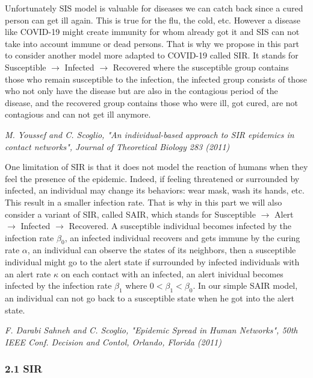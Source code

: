\documentclass{article}
\begin{document}
Unfortunately SIS model is valuable for diseases we can catch back since a cured person can get ill again. This is true for the flu, the cold, etc. However a disease like COVID-19 might create immunity for whom already got it and SIS can not take into account immune or dead persons. That is why we propose in this part to consider another model more adapted to COVID-19 called SIR. It stands for Susceptible $\rightarrow$ Infected $\rightarrow$ Recovered where the susceptible group contains those who remain susceptible to the infection, the infected group consists of those who not only have the disease but are also in the contagious period of the disease, and the recovered group contains those who were ill, got cured, are not contagious and can not get ill anymore.

\medskip

\textit{M. Youssef and C. Scoglio, "An individual-based approach to SIR epidemics in contact networks", Journal of Theoretical Biology 283 (2011)}

\medskip

One limitation of SIR is that it does not model the reaction of humans when they feel the presence of the epidemic. Indeed, if feeling threatened or surrounded by infected, an individual may change its behaviors: wear mask, wash its hands, etc. This result in a smaller infection rate. That is why in this part we will also consider a variant of SIR, called SAIR, which stands for Susceptible $\rightarrow$ Alert $\rightarrow$ Infected $\rightarrow$ Recovered. A susceptible individual becomes infected by the infection rate $\beta_{0}$, an infected individual recovers and gets immune by the curing rate $\alpha$, an individual can observe the states of its neighbors, then a susceptible individual might go to the alert state if surrounded by infected individuals with an alert rate $\kappa$ on each contact with an infected, an alert inividual becomes infected by the infection rate $\beta_{1}$ where $0<\beta_{1}<\beta_{0}$. In our simple SAIR model, an individual can not go back to a susceptible state when he got into the alert state.

\medskip

\textit{F. Darabi Sahneh and C. Scoglio, "Epidemic Spread in Human Networks", 50th IEEE Conf. Decision and Contol, Orlando, Florida (2011)}

\subsubsection*{2.1 SIR}
\end{document}
